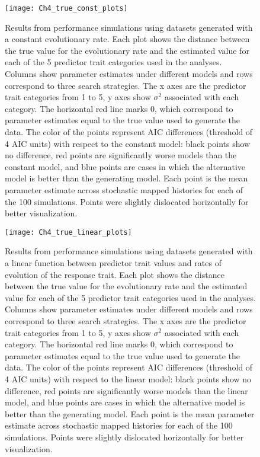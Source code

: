 \begin{figure}[hp]
	\centering
	\texttt{[image: Ch4\_true\_const\_plots]}
	\caption[Results from performance simulations using datasets generated with a constant evolutionary rate.]{Results from performance simulations using datasets generated with a constant evolutionary rate. Each plot shows the distance between the true value for the evolutionary rate and the estimated value for each of the 5 predictor trait categories used in the analyses. Columns show parameter estimates under different models and rows correspond to three search strategies. The x axes are the predictor trait categories from 1 to 5, y axes show $\sigma^{2}$ associated with each category. The horizontal red line marks 0, which correspond to parameter estimates equal to the true value used to generate the data. The color of the points represent AIC differences (threshold of 4 AIC units) with respect to the constant model: black points show no difference, red points are significantly worse models than the constant model, and blue points are cases in which the alternative model is better than the generating model. Each point is the mean parameter estimate across stochastic mapped histories for each of the 100 simulations. Points were slightly dislocated horizontally for better visualization.}
	\label{fig:chart_const}
\end{figure}

\begin{figure}[hp]
	\centering
	\texttt{[image: Ch4\_true\_linear\_plots]}
	\caption[Results from performance simulations using datasets generated with a linear function between predictor trait values and rates of evolution of the response trait.]{Results from performance simulations using datasets generated with a linear function between predictor trait values and rates of evolution of the response trait. Each plot shows the distance between the true value for the evolutionary rate and the estimated value for each of the 5 predictor trait categories used in the analyses. Columns show parameter estimates under different models and rows correspond to three search strategies. The x axes are the predictor trait categories from 1 to 5, y axes show $\sigma^{2}$ associated with each category. The horizontal red line marks 0, which correspond to parameter estimates equal to the true value used to generate the data. The color of the points represent AIC differences (threshold of 4 AIC units) with respect to the linear model: black points show no difference, red points are significantly worse models than the linear model, and blue points are cases in which the alternative model is better than the generating model. Each point is the mean parameter estimate across stochastic mapped histories for each of the 100 simulations. Points were slightly dislocated horizontally for better visualization.}
	\label{fig:chart_linear}
\end{figure}

